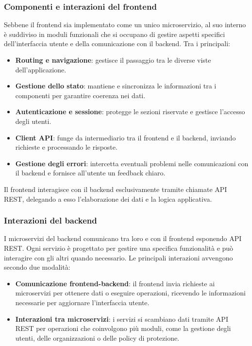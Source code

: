 \subsubsection{Componenti e interazioni del frontend}
Sebbene il frontend sia implementato come un unico microservizio, al suo interno è suddiviso in moduli funzionali che si occupano di gestire aspetti specifici dell’interfaccia utente e della comunicazione con il backend. Tra i principali:
\begin{itemize}
  \item \textbf{Routing e navigazione}: gestisce il passaggio tra le diverse viste dell'applicazione.
  \item \textbf{Gestione dello stato}: mantiene e sincronizza le informazioni tra i componenti per garantire coerenza nei dati.
  \item \textbf{Autenticazione e sessione}: protegge le sezioni riservate e gestisce l’accesso degli utenti.
  \item \textbf{Client API}: funge da intermediario tra il frontend e il backend, inviando richieste e processando le risposte.
  \item \textbf{Gestione degli errori}: intercetta eventuali problemi nelle comunicazioni con il backend e fornisce all'utente un feedback chiaro.
\end{itemize}

Il frontend interagisce con il backend esclusivamente tramite chiamate API REST, delegando a esso l'elaborazione dei dati e la logica applicativa.

\subsubsection{Interazioni del backend}
I microservizi del backend comunicano tra loro e con il frontend esponendo API REST. Ogni servizio è progettato per gestire una specifica funzionalità e può interagire con gli altri quando necessario. Le principali interazioni avvengono secondo due modalità:
\begin{itemize}
  \item \textbf{Comunicazione frontend-backend}: il frontend invia richieste ai microservizi per ottenere dati o eseguire operazioni, ricevendo le informazioni necessarie per aggiornare l'interfaccia utente.
  \item \textbf{Interazioni tra microservizi}: i servizi si scambiano dati tramite API REST per operazioni che coinvolgono più moduli, come la gestione degli utenti, delle organizzazioni o delle policy di protezione.
\end{itemize}

